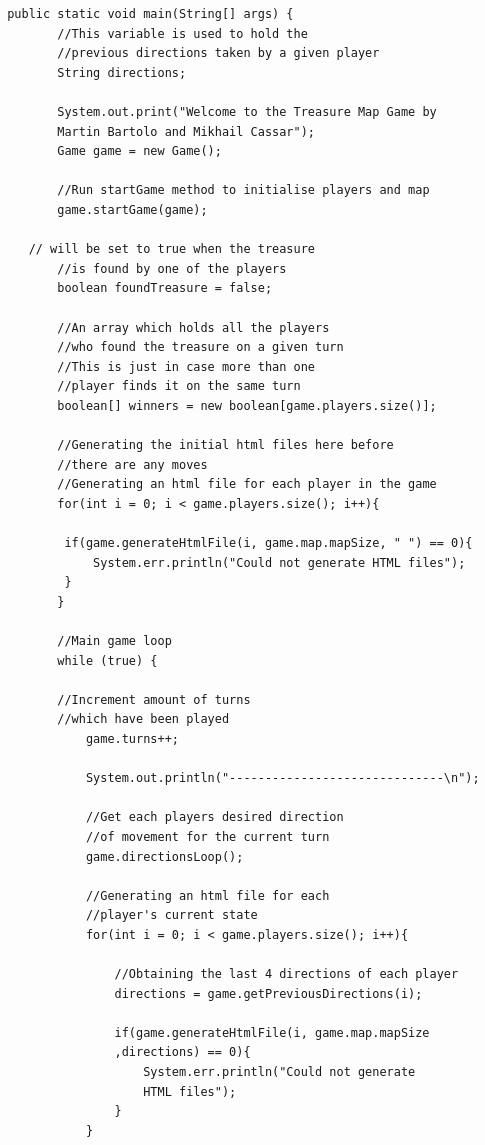 \documentclass[a4paper,12pt]{extarticle}
\begin{document}
\begin{lstlisting}
 public static void main(String[] args) {
        //This variable is used to hold the 
        //previous directions taken by a given player
        String directions;

        System.out.print("Welcome to the Treasure Map Game by 
        Martin Bartolo and Mikhail Cassar");
        Game game = new Game();

        //Run startGame method to initialise players and map
        game.startGame(game);
        
	// will be set to true when the treasure
        //is found by one of the players
        boolean foundTreasure = false;
        
        //An array which holds all the players 
        //who found the treasure on a given turn
        //This is just in case more than one 
        //player finds it on the same turn
        boolean[] winners = new boolean[game.players.size()];

        //Generating the initial html files here before 
        //there are any moves
        //Generating an html file for each player in the game
        for(int i = 0; i < game.players.size(); i++){

         if(game.generateHtmlFile(i, game.map.mapSize, " ") == 0){
             System.err.println("Could not generate HTML files");
         }
        }

        //Main game loop
        while (true) {
        
        //Increment amount of turns 
        //which have been played        
            game.turns++;

            System.out.println("------------------------------\n");

            //Get each players desired direction 
            //of movement for the current turn
            game.directionsLoop();

            //Generating an html file for each 
            //player's current state
            for(int i = 0; i < game.players.size(); i++){

                //Obtaining the last 4 directions of each player
                directions = game.getPreviousDirections(i);

                if(game.generateHtmlFile(i, game.map.mapSize
                ,directions) == 0){
                    System.err.println("Could not generate 
                    HTML files");
                }
            }


\end{lstlisting}
\end{document}
